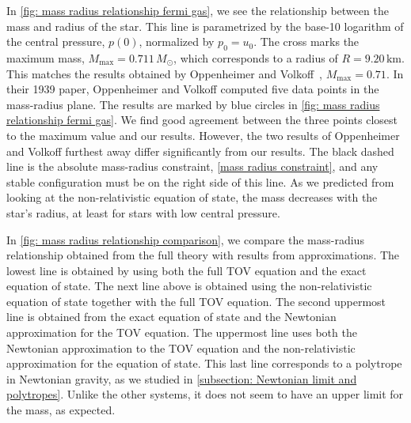 In \autoref{fig: mass radius relationship fermi gas}, we see the relationship between the mass and radius of the star.
This line is parametrized by the base-10 logarithm of the central pressure, $p(0)$, normalized by $p_0 = u_0$.
The cross marks the maximum mass, $M_\mathrm{max} = 0.711 \, M_\odot$, which corresponds to a radius of $R = 9.20 \, \mathrm{km}$.
This matches the results obtained by Oppenheimer and Volkoff~\cite{oppenheimerMassiveNeutronCores1939}, $M_\mathrm{max} = 0.71$.
In their 1939 paper, Oppenheimer and Volkoff computed five data points in the mass-radius plane.
The results are marked by blue circles in \autoref{fig: mass radius relationship fermi gas}.
We find good agreement between the three points closest to the maximum value and our results.
However, the two results of Oppenheimer and Volkoff furthest away differ significantly from our results.
The black dashed line is the absolute mass-radius constraint, \autoref{mass radius constraint}, and any stable configuration must be on the right side of this line.
As we predicted from looking at the non-relativistic equation of state, the mass decreases with the star's radius, at least for stars with low central pressure.

In \autoref{fig: mass radius relationship comparison}, we compare the mass-radius relationship obtained from the full theory with results from approximations.
The lowest line is obtained by using both the full TOV equation and the exact equation of state.
The next line above is obtained using the non-relativistic equation of state together with the full TOV equation.
The second uppermost line is obtained from the exact equation of state and the Newtonian approximation for the TOV equation.
The uppermost line uses both the Newtonian approximation to the TOV equation and the non-relativistic approximation for the equation of state.
This last line corresponds to a polytrope in Newtonian gravity, as we studied in \autoref{subsection: Newtonian limit and polytropes}.
Unlike the other systems, it does not seem to have an upper limit for the mass, as expected.
\vfill

